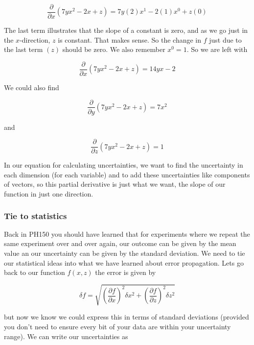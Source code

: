 \begin{equation*}
   \frac{\partial }{\partial x}\left( 7yx^{2}-2x+z\right) =7y\left( 2\right)x^{1}-2(1)x^{0}+z\left( 0\right)
\end{equation*}

The last term illustrates that the slope of a constant is zero, and as we go just in the $x$-direction, $z$ is constant. That makes sense. So the change in $f$ just due to the last term $(z)$ should be zero. We also remember $x^{0}=1.$ So we are left with 

\begin{equation*}
	\frac{\partial }{\partial x}\left( 7yx^{2}-2x+z\right) =14yx-2
\end{equation*}

We could also find 

\begin{equation*}
	\frac{\partial }{\partial y}\left( 7yx^{2}-2x+z\right) =7x^{2}
\end{equation*}

and

\begin{equation*}
	\frac{\partial }{\partial z}\left( 7yx^{2}-2x+z\right) =1
\end{equation*}

In our equation for calculating uncertainties, we want to find the uncertainty in each dimension (for each variable) and to add these uncertainties like components of vectors, so this partial derivative is just what we want, the slope of our function in just one direction.

\subsubsection{Tie to statistics}

Back in PH150 you should have learned that for experiments where we repeat the same experiment over and over again, our outcome can be given by the mean value an our uncertainty can be given by the standard deviation. We need to tie our statistical ideas into what we have learned about error propagation. Lets go back to our function $f\left( x,z\right) $ the error is given by 

\begin{equation*}
	\delta f=\sqrt{\left( \frac{\partial f}{\partial x}\right) ^{2}\delta x^{2}+\left( \frac{\partial f}{\partial z}\right) ^{2}\delta z^{2}}
\end{equation*}

but now we know we could express this in terms of standard deviations (provided you don't need to ensure every bit of your data are within your uncertainty range). We can write our uncertainties as 

